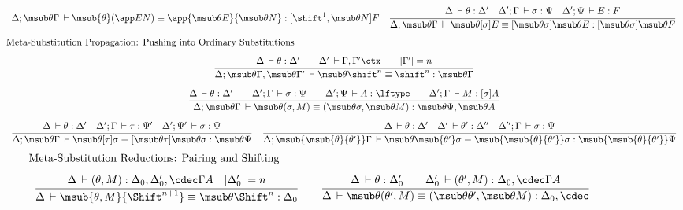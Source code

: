 \documentclass[copyright,creativecommons]{eptcs}
\makeatletter
\newcommand{\der}{\,\vdash}
\newcommand{\length}[1]{|#1|}
\newcommand{\ru}[2]{\dfrac{\begin{array}[b]{@{}c@{}} #1 \end{array}}{#2}}
\newcommand{\cxt}{\ctx}  \newcommand{\mcxt}{\mctx}
\newcommand{\shiftby}[1]{\shift^{#1}}
\newcommand{\Shiftby}[1]{\Shift^{#1}}
\newcommand{\esub}[1]{[#1]}
\newcommand{\msubp}[2]{\msub{#1}(#2)}
\newcommand{\abox}[1]{\multicolumn 1 {@{}p{\textwidth}@{}} {#1}}
\makeatother
\begin{document}
\begin{figure}
\[\begin{array}[h]{c}
{  }{\Delta; \msub \theta \Gamma \der \msubp \theta {\app E N} \equiv 
      \app {\msub \theta E} {\msub \theta N} : \esub {\shiftby 1, \msub
        \theta N} F
  }
\quad
\ru{\Delta \der \theta : \Delta' \quad
    \Delta'; \Gamma \der \sigma : \Psi \quad
    \Delta'; \Psi \der E : F
  }{\Delta ; \msub \theta \Gamma \der \msub \theta {\esub \sigma E}
      \equiv \esub {\msub \theta \sigma} {\msub \theta E}
      :  \esub {\msub \theta \sigma} {\msub \theta F} 
  }
\end{array}
\]
\[
\begin{array}[h]{c}
\abox{Meta-Substitution Propagation: Pushing into Ordinary Substitutions}
\\[0.75em]
\ru{\Delta \der \theta : \Delta' \qquad
    \Delta' \der \Gamma,\Gamma' \cxt \qquad
    \length{\Gamma'} = n
  }{\Delta; \msub \theta \Gamma, \msub \theta {\Gamma'} \der
      \msub \theta {\shiftby n} \equiv \shiftby n : \msub \theta
      \Gamma
  }
\\[1.5em]
\ru{\Delta \der \theta : \Delta' \qquad
    \Delta'; \Gamma \der \sigma : \Psi \qquad
    \Delta'; \Psi \der A : \lftype \qquad
    \Delta'; \Gamma \der M : \esub \sigma A
  }{\Delta; \msub \theta \Gamma \der 
      \msub \theta {(\sigma, M)}
      \equiv (\msub \theta \sigma, \msub \theta M)
      : \msub \theta \Psi, \msub \theta A
  }
\\[1.5em]  
\ru{\Delta \der \theta : \Delta' \quad
    \Delta'; \Gamma \der \tau : \Psi' \quad
    \Delta'; \Psi'  \der \sigma : \Psi
  }{\Delta; \msub \theta \Gamma \der \msub \theta {\esub \tau \sigma}
      \equiv \esub {\msub \theta \tau} {\msub \theta \sigma}
      : \msub \theta \Psi
  }
\quad
\ru{\Delta \der \theta : \Delta' \quad
    \Delta' \der \theta' : \Delta'' \quad
    \Delta''; \Gamma \der \sigma : \Psi
  }{\Delta;\msub{\msub{\theta}{\theta'}} \Gamma \der 
      \msub \theta {\msub{\theta'}\sigma} 
      \equiv \msub{\msub{\theta}{\theta'}} \sigma
      : \msub{\msub{\theta}{\theta'}} \Psi
  }
\end{array}
\]
\[
\begin{array}[h]{c}
\abox{Meta-Substitution Reductions: Pairing and Shifting}
\\[0.75em]
\ru{\Delta \der (\theta,M) : \Delta_0, \Delta_0', \cdec \Gamma A \quad
    \length{\Delta_0'} = n
  }{\Delta \der \msub {\theta, M} {\Shiftby {n+1}} \equiv
    \msub \theta {\Shiftby n} : \Delta_0 } 
\qquad
\ru{\Delta \der \theta : \Delta_0' \qquad
    \Delta_0' \der ({\theta'},M) : \Delta_0, \cdec \Gamma A
  }{\Delta \der \msub \theta ({\theta'}, M) 
     \equiv (\msub \theta {\theta'}, \msub \theta M) : \Delta_0, \cdec
}
\end{array}\]
\end{figure}
\end{document}
